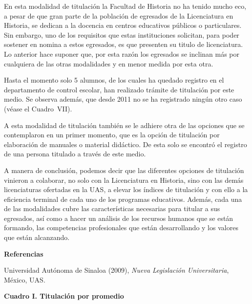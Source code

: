 En esta modalidad de titulación la Facultad de Historia no ha tenido mucho
eco, a pesar de que gran parte de la población de egresados de la
Licenciatura en Historia, se dedican a la docencia en centros educativos
públicos o particulares. Sin embargo, uno de los requisitos que estas
instituciones solicitan, para poder sostener en nomina  a estos egresados,
es que presenten su titulo de licenciatura. Lo anterior hace suponer que,
por esta razón los egresados se inclinan más por cualquiera de las otras
modalidades y en menor medida por esta otra.

Hasta el momento solo 5 alumnos, de los cuales ha quedado registro en el
departamento de control escolar, han realizado trámite de titulación por
este medio. Se observa además, que desde 2011 no se ha registrado ningún
otro caso (véase el Cuadro~VII). 

A esta modalidad de titulación también se le adhiere otra de las opciones
que se contemplaron en un primer momento, que es la opción de titulación
por elaboración de manuales o material didáctico. De esta solo se encontró
el registro de una persona titulado a través de este medio.
\enlargethispage{1\baselineskip}

A manera de conclusión, podemos decir que las diferentes opciones de
titulación vinieron a colaborar, no solo con la Licenciatura en Historia,
sino con las demás licenciaturas ofertadas en la UAS, a elevar los índices
de titulación y con ello a la eficiencia terminal de cada uno de los
programas educativos. Además, cada una de las modalidades cubre las
características necesarias para titular a sus egresados, así como a hacer
un análisis de los recursos humanos que se están formando, las competencias
profesionales que están desarrollando y los valores que están alcanzando.

\medskip
\textbf{Referencias}

Universidad Autónoma de Sinaloa (2009), \textit{Nueva Legislación Universitaria},
México, UAS.
\newpage

\textbf{\footnotesize Cuadro I. Titulación por promedio}\par

